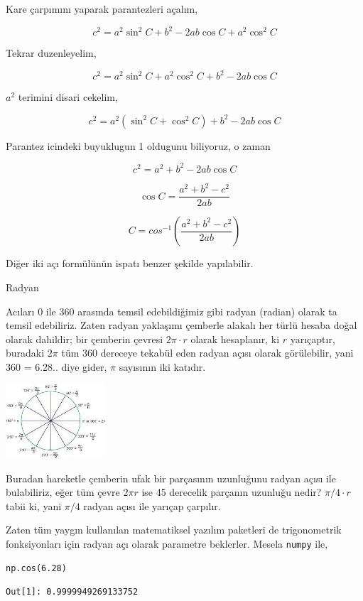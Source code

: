 \documentclass[12pt,fleqn]{article}\usepackage{../../common}
\begin{document}
Kare çarpımını yaparak parantezleri açalım,

$$
c^2 = a^2 \sin^2 C + b^2 - 2ab\cos C + a^2 \cos^2 C
$$

Tekrar duzenleyelim,

$$
c^2 = a^2 \sin^2 C + a^2 \cos^2 C + b^2 - 2ab \cos C
$$

$a^2$ terimini disari cekelim,

$$
c^2 = a^2 (\sin^2 C + \cos^2 C) + b^2 - 2ab\cos C
$$

Parantez icindeki buyuklugun 1 oldugunu biliyoruz, o zaman

$$
c^2 = a^2 + b^2 - 2ab\cos C
$$

$$
\cos C = \frac{a^2 + b^2 - c^2}{2ab}
$$

$$
C = cos^{-1} \left( \frac{a^2 + b^2 - c^2}{2ab}  \right)
$$

Diğer iki açı formülünün ispatı benzer şekilde yapılabilir.

Radyan

Acıları 0 ile 360 arasında temsil edebildiğimiz gibi radyan (radian) olarak ta
temsil edebiliriz. Zaten radyan yaklaşımı çemberle alakalı her türlü hesaba
doğal olarak dahildir; bir çemberin çevresi $2 \pi \cdot r$ olarak hesaplanır,
ki $r$ yarıçaptır, buradaki $2 \pi$ tüm 360 dereceye tekabül eden radyan açısı
olarak görülebilir, yani 360 = 6.28.. diye gider, $\pi$ sayısının iki katıdır.

\includegraphics[width=10em]{ode_mattuck_50_trig_05.jpg}

Buradan hareketle çemberin ufak bir parçasının uzunluğunu radyan açısı ile
bulabiliriz, eğer tüm çevre $2 \pi r$ ise 45 derecelik parçanın uzunluğu
nedir? $\pi / 4 \cdot r$ tabii ki, yani $\pi / 4$ radyan açısı ile yarıçap
çarpılır.

Zaten tüm yaygın kullanılan matematiksel yazılım paketleri de trigonometrik
fonksiyonları için radyan açı olarak parametre beklerler. Mesela \verb!numpy!
ile,

\begin{verbatim}
np.cos(6.28)
\end{verbatim}

\begin{verbatim}
Out[1]: 0.9999949269133752
\end{verbatim}
\end{document}
